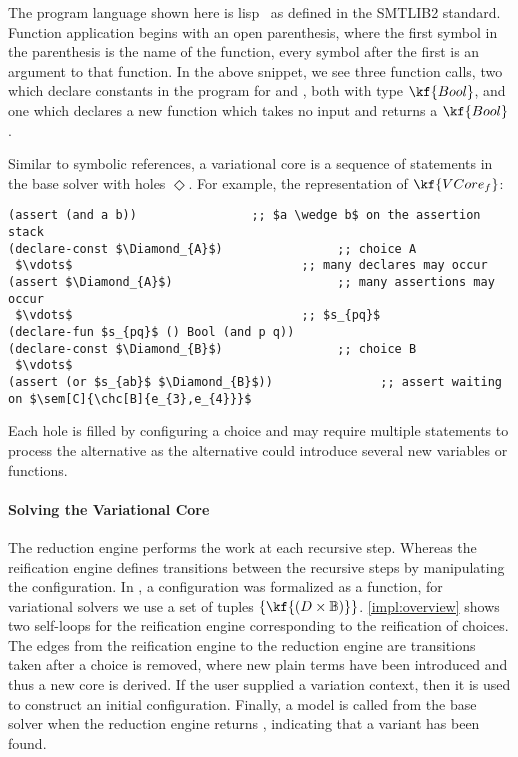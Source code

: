 The program language shown here is lisp~\cite{10.1145/367177.367199} as defined
in the SMTLIB2 standard. Function application begins with an open parenthesis,
where the first symbol in the parenthesis is the name of the function, every
symbol after the first is an argument to that function. In the above snippet, we
see three function calls, two which declare constants in the program for \pV{}
and \qV{}, both with type $\kf{Bool}$, and one which declares a new function
which takes no input and returns a $\kf{Bool}$.

Similar to symbolic references, a variational core is a sequence of statements
in the base solver with holes $\Diamond$. For example, the representation of
$\kf{VCore_{f}}$:
%
\begin{lstlisting}[columns=flexible,keepspaces=true]
(assert (and a b))                ;; $a \wedge b$ on the assertion stack
(declare-const $\Diamond_{A}$)                ;; choice A
 $\vdots$                                ;; many declares may occur
(assert $\Diamond_{A}$)                       ;; many assertions may occur
 $\vdots$                                ;; $s_{pq}$
(declare-fun $s_{pq}$ () Bool (and p q))
(declare-const $\Diamond_{B}$)                ;; choice B
 $\vdots$
(assert (or $s_{ab}$ $\Diamond_{B}$))               ;; assert waiting on $\sem[C]{\chc[B]{e_{3},e_{4}}}$
\end{lstlisting}
%
Each hole is filled by configuring a choice and may require multiple statements
to process the alternative as the alternative could introduce several new
variables or functions.

\paragraph{Solving the Variational Core}

The reduction engine performs the work at each recursive step. Whereas the
reification engine defines transitions between the recursive steps by
manipulating the configuration. In \vpl{}, a configuration was formalized as a
function, for variational solvers we use a set of tuples $\{\kf{(D \times
  \mathbb{B})}\}$. \autoref{impl:overview} shows two self-loops for the
reification engine corresponding to the reification of choices. The edges from
the reification engine to the reduction engine are transitions taken after a
choice is removed, where new plain terms have been introduced and thus a new
core is derived. If the user supplied a variation context, then it is used to
construct an initial configuration. Finally, a model is called from the base
solver when the reduction engine returns \unit{}, indicating that a variant has
been found.

